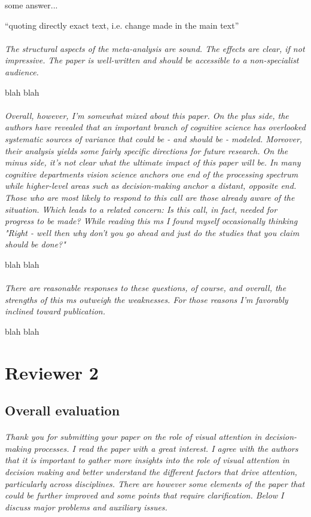 \documentclass[english,natbib,man,floatsintext]{apa6}
\newcommand\eatpunct[1]{}
\newcommand{\com}[2][]{\vspace{5mm}\paragraph[ ]{ \eatpunct}\label{#1}\emph{#2}\vspace{5mm}}
\newcommand{\quotetext}[1]{\vspace{2mm}\noindent \hangindent=-2cm \hangafter=0 ``#1''\vspace{2mm}}
\begin{document}
some answer...

\quotetext{quoting directly exact text, i.e. change made in the main text} 


\com[com-r1-XX]{The structural aspects of the meta-analysis are sound. The effects are clear, if not impressive. The paper is well-written and should be accessible to a non-specialist audience.}

blah blah


\com[com-r1-XX]{Overall, however, I'm somewhat mixed about this paper. On the plus side, the authors have revealed that an important branch of cognitive science has overlooked systematic sources of variance that could be - and should be - modeled. Moreover, their analysis yields some fairly specific directions for future research. On the minus side, it's not clear what the ultimate impact of this paper will be. In many cognitive departments vision science anchors one end of the processing spectrum while higher-level areas such as decision-making anchor a distant, opposite end. Those who are most likely to respond to this call are those already aware of the situation. Which leads to a related concern: Is this call, in fact, needed for progress to be made? While reading this ms I found myself occasionally thinking "Right - well then why don't you go ahead and just do the studies that you claim should be done?"}

blah blah


\com[com-r1-XX]{There are reasonable responses to these questions, of course, and overall, the strengths of this ms outweigh the weaknesses. For those reasons I'm favorably inclined toward publication.}

blah blah




\section{Reviewer 2}
\label{rev:r2}

\subsection{Overall evaluation}
\label{rev:r2sum}

\com[com-r2-eval]{Thank you for submitting your paper on the role of visual attention in decision-making processes. I read the paper with a great interest. I agree with the authors that it is important to gather more insights into the role of visual attention in decision making and better understand the different factors that drive attention, particularly across disciplines. There are however some elements of the paper that could be further improved and some points that require clarification. Below I discuss major problems and auxiliary issues.} 
\end{document}
